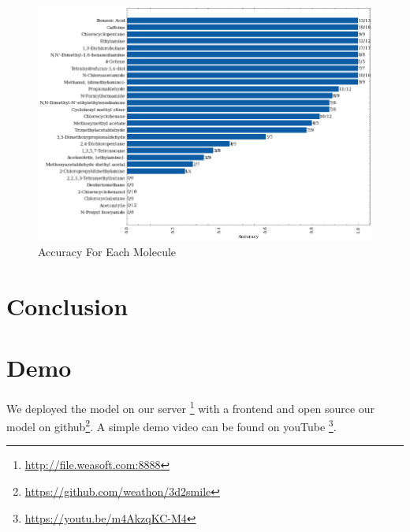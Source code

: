 \documentclass[12pt]{article}
\begin{document}
\begin{figure}
    \centering
    \includegraphics[width=0.8\linewidth]{image.png}
    \caption{Accuracy For Each Molecule}
    \label{fig:acc_each}
\end{figure}
\section{Conclusion}
\section{Demo}
We deployed the model on our server \footnote{\url{http://file.weasoft.com:8888}} with a frontend and open source our model on github\footnote{\url{https://github.com/weathon/3d2smile}}. A simple demo video can be found on youTube \footnote{\url{https://youtu.be/m4AkzqKC-M4}}. 
\end{document}
